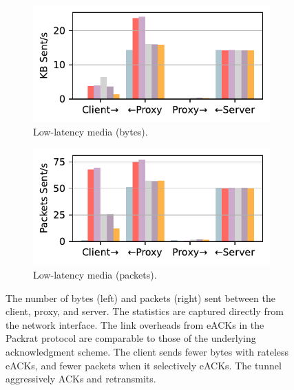 \begin{figure}[ht]
\begin{minipage}[t]{0.68\textwidth}
    \begin{subfigure}[b]{0.49\linewidth}
        \centering
        \includegraphics[width=\linewidth]{packrat-paper/figures/network_stats_media_tx_bytes.pdf}
        \caption{Low-latency media (bytes).}
        \label{fig:link-overheads:media-bytes}
    \end{subfigure}
    \begin{subfigure}[b]{0.49\linewidth}
        \centering
        \includegraphics[width=\linewidth]{packrat-paper/figures/network_stats_media_tx_packets.pdf}
        \caption{Low-latency media (packets).}
        \label{fig:link-overheads:media-packets}
    \end{subfigure}
    
    \caption{The number of bytes (left) and packets (right) sent between the
     client, proxy, and server. The statistics are captured directly from the
     network interface. The link overheads from eACKs in the Packrat protocol are
     comparable to those of the underlying acknowledgment scheme. The client
     sends fewer bytes with rateless eACKs, and fewer packets when it
     selectively eACKs. The tunnel aggressively ACKs and retransmits.}
    \label{fig:link-overheads}
\end{minipage}
\end{figure}